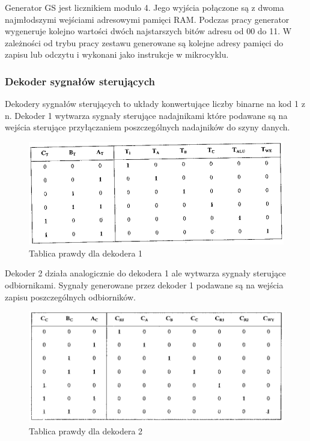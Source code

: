 \documentclass[../main.tex]{subfiles}
\begin{document}
        Generator GS jest licznikiem modulo 4. Jego wyjścia połączone są z dwoma najmłodszymi wejściami adresowymi pamięci RAM. Podczas pracy
        generator wygeneruje kolejno wartości dwóch najstarszych bitów adresu od 00 do 11. W zależności od trybu pracy zestawu generowane są
        kolejne adresy pamięci do zapisu lub odczytu i wykonani jako instrukcje w mikrocyklu.

        \subsubsection*{Dekoder sygnałów sterujących}
        
        Dekodery sygnałów sterujących to układy konwertujące liczby binarne na kod 1 z n. Dekoder 1 wytwarza sygnały sterujące nadajnikami które
        podawane są na wejścia sterujące przyłączaniem poszczególnych nadajników do szyny danych.

        \begin{figure}[H]
            \centering
            \includegraphics[width=\linewidth]{nadajniki.png}
            \caption{Tablica prawdy dla dekodera 1}
            \label{fig:nadajniki}
        \end{figure}

        Dekoder 2 działa analogicznie do dekodera 1 ale wytwarza sygnały sterujące odbiornikami. Sygnały generowane przez dekoder 1 podawane
        są na wejścia zapisu poszczególnych odbiorników.

        \begin{figure}[H]
            \centering
            \includegraphics[width=\linewidth]{odbiorniki.png}
            \caption{Tablica prawdy dla dekodera 2}
            \label{fig:odbiorniki}
        \end{figure}
\end{document}
